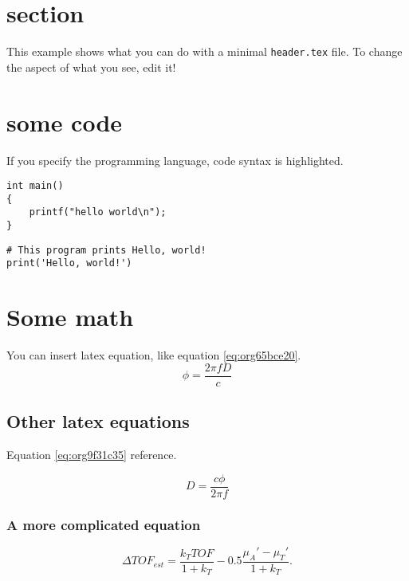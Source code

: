 


\maketitle

\newpage

\section{section}
\label{sec:org2f75cbd}
This example shows what you can do with a minimal \texttt{header.tex} file.
To change the aspect of what you see, edit it!

\section{some code}
\label{sec:org6525016}
If you specify the programming language, code syntax is highlighted.
\begin{verbatim}
int main()
{
    printf("hello world\n");
}
\end{verbatim}

\begin{verbatim}
# This program prints Hello, world!
print('Hello, world!')
\end{verbatim}

\section{Some math}
\label{sec:orgcf1f883}
You can insert latex equation, like equation \ref{eq:org65bce20}.
\begin{equation}
\label{eq:org65bce20}
\phi = \frac{2\pi fD}{c}
\end{equation}
\subsection{Other latex equations}
\label{sec:org92178bc}
Equation \ref{eq:org9f31c35} reference.

\begin{equation}
\label{eq:org9f31c35}
D = \frac{c\phi}{2\pi f}
\end{equation}

\subsubsection{A more complicated equation}
\label{sec:org77a7a9f}

\begin{equation}
\Delta TOF_{est} = \frac{k_T TOF}{1+k_T } - 0.5 \frac{\mu_A' - \mu_T'}{1+k_T}.
\end{equation}

